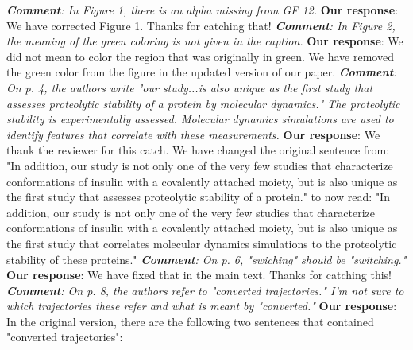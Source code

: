 \documentclass[sn-vancouver]{sn-jnl}
\begin{document}
\newline
\newline
\indent
\textit{\textbf{Comment}:
In Figure 1, there is an alpha missing from GF 12.}
\newline
\indent 
{\bf Our response}:
We have corrected Figure 1. Thanks for catching that!
\newline
\newline
\indent
\textit{\textbf{Comment}:
In Figure 2, the meaning of the green coloring is not given in the caption.}
\newline
\indent 
{\bf Our response}:
We did not mean to color the region that was originally in green. We have removed the green color from the figure in the updated version of our paper. 
\newline
\newline
\indent
\textit{\textbf{Comment}:
On p. 4, the authors write "our study...is also unique as the first study that assesses proteolytic stability of a protein by molecular dynamics." The proteolytic stability is experimentally assessed.  Molecular dynamics simulations are used to identify features that correlate with these measurements.}
\newline
\indent 
{\bf Our response}: 
We thank the reviewer for this catch. We have changed the original sentence from:
\newline
"In addition, our study is not only one of the very few studies that characterize conformations of insulin with a covalently attached moiety, but is also unique as the first study that assesses proteolytic stability of a protein." to now read: "In addition, our study is not only one of the very few studies that characterize conformations of insulin with a covalently attached moiety, but is also unique as the first study that correlates molecular dynamics simulations to the proteolytic stability of these proteins."
\newline
\newline
\indent
\textit{\textbf{Comment}:
On p. 6, "swiching" should be "switching."}
\newline
\indent 
{\bf Our response}: We have fixed that in the main text. Thanks for catching this!
\newline
\newline
\indent
\textit{\textbf{Comment}:
On p. 8, the authors refer to "converted trajectories."  I'm not sure to which trajectories these refer and what is meant by "converted."}
\newline
\indent 
{\bf Our response}:
In the original version, there are the following two sentences that contained "converted trajectories":
\end{document}
